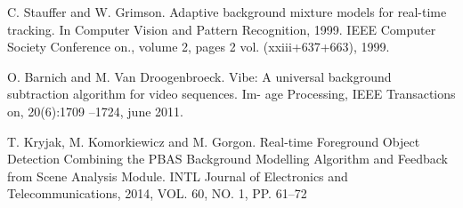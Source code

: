 \begin{thebibliography}{9}

C. Stauffer and W. Grimson. Adaptive background mixture
models for real-time tracking. In Computer Vision and Pattern Recognition, 1999.
IEEE Computer Society Conference on., volume 2, pages 2 vol. (xxiii+637+663), 1999.

O. Barnich and M. Van Droogenbroeck. Vibe: A universal
background subtraction algorithm for video sequences. Im-
age Processing, IEEE Transactions on, 20(6):1709 –1724,
june 2011.
 
T. Kryjak, M. Komorkiewicz and M. Gorgon.
Real-time Foreground Object Detection Combining
the PBAS Background Modelling Algorithm
and Feedback from Scene Analysis Module.
INTL Journal of Electronics and Telecommunications, 2014, VOL. 60, NO. 1, PP. 61–72

\end{thebibliography}
